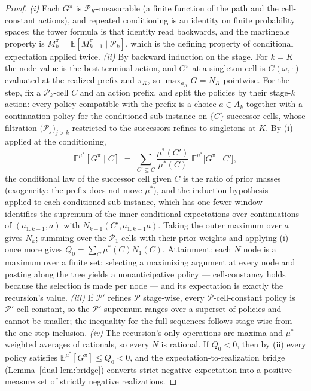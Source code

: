 \documentclass[10pt,twocolumn]{article}
\theoremstyle{plain}
\theoremstyle{definition}
\theoremstyle{remark}
\begin{document}
\begin{proof}
\emph{(i)} Each $G^{\pi}$ is $\mathcal{P}_{K}$-measurable (a finite
function of the path and the cell-constant actions), and repeated
conditioning is an identity on finite probability spaces; the tower
formula is that identity read backwards, and the martingale property is
$M^{\pi}_{k} = \mathbb{E}[M^{\pi}_{k+1} \mid \mathcal{P}_{k}]$, which
is the defining property of conditional expectation applied twice.
\emph{(ii)} By backward induction on the stage. For $k = K$ the node
value is the best terminal action, and $G^{\pi}$ at a singleton cell is
$G(\omega, \cdot)$ evaluated at the realized prefix and $\pi_{K}$, so
$\max_{a_{K}} G = N_{K}$ pointwise. For the step, fix a
$\mathcal{P}_{k}$-cell $C$ and an action prefix, and split the policies
by their stage-$k$ action: every policy compatible with the prefix is a
choice $a \in A_{k}$ together with a continuation policy for the
conditioned sub-instance on $\{C\}$-successor cells, whose filtration
$\bigl(\mathcal{P}_{j}\bigr)_{j > k}$ restricted to the successors
refines to singletons at $K$. By (i) applied at the conditioning,
\[
\mathbb{E}^{\mu^{*}}[G^{\pi} \mid C] \;=\;
\sum_{C' \subseteq C} \frac{\mu^{*}(C')}{\mu^{*}(C)}\;
\mathbb{E}^{\mu^{*}}\bigl[G^{\pi} \mid C'\bigr],
\]
the conditional law of the successor cell given $C$ is the ratio of
prior masses (exogeneity: the prefix does not move $\mu^{*}$), and the
induction hypothesis --- applied to each conditioned sub-instance,
which has one fewer window --- identifies the supremum of the inner
conditional expectations over continuations of $(a_{1:k-1}, a)$ with
$N_{k+1}(C', a_{1:k-1}a)$. Taking the outer maximum over $a$ gives
$N_{k}$; summing over the $\mathcal{P}_{1}$-cells with their prior
weights and applying (i) once more gives $Q_{0} = \sum_{C}
\mu^{*}(C) N_{1}(C)$. Attainment: each $N$ node is a maximum over a
finite set; selecting a maximizing argument at every node and pasting
along the tree yields a nonanticipative policy --- cell-constancy holds
because the selection is made per node --- and its expectation is
exactly the recursion's value. \emph{(iii)} If $\mathcal{P}'$ refines
$\mathcal{P}$ stage-wise, every $\mathcal{P}$-cell-constant policy is
$\mathcal{P}'$-cell-constant, so the $\mathcal{P}'$-supremum ranges
over a superset of policies and cannot be smaller; the inequality for
the full sequences follows stage-wise from the one-step inclusion.
\emph{(iv)} The recursion's only operations are maxima and
$\mu^{*}$-weighted averages of rationals, so every $N$ is rational. If
$Q_{0} < 0$, then by (ii) every policy satisfies
$\mathbb{E}^{\mu^{*}}[G^{\pi}] \le Q_{0} < 0$, and the
expectation-to-realization bridge (Lemma~\ref{dual-lem:bridge}) converts strict negative expectation into a
positive-measure set of strictly negative realizations.
\end{proof}
\end{document}
